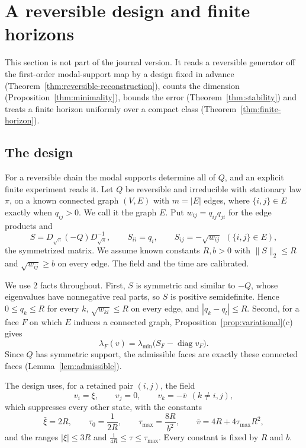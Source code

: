 \section{A reversible design and finite horizons}\label{sec:reversible}

This section is not part of the journal version. It reads a reversible generator off the
first-order modal-support map by a design fixed in advance
(Theorem~\ref{thm:reversible-reconstruction}), counts the dimension
(Proposition~\ref{thm:minimality}), bounds the error (Theorem~\ref{thm:stability}) and treats a
finite horizon uniformly over a compact class (Theorem~\ref{thm:finite-horizon}).

\subsection{The design}\label{sec:reversible-reconstruction}

For a reversible chain the modal supports determine all of $Q$, and an explicit finite
experiment reads it. Let $Q$ be reversible and irreducible with stationary law $\pi$, on a known
connected graph $(V,E)$ with $m=|E|$ edges, where $\{i,j\}\in E$ exactly when $q_{ij}>0$. We
call it the graph $E$.
Put $w_{ij}=q_{ij}q_{ji}$ for the edge products and
\[
 S=D_{\sqrt\pi}(-Q)D_{\sqrt\pi}^{-1},\qquad S_{ii}=q_i,\qquad S_{ij}=-\sqrt{w_{ij}}\ \ (\{i,j\}\in E),
\]
the symmetrized matrix. We assume known constants $R,b>0$ with $\|S\|_2\le R$ and
$\sqrt{w_{ij}}\ge b$ on every edge. The field and the time are calibrated.

We use 2 facts throughout. First, $S$ is symmetric and similar to $-Q$, whose eigenvalues
have nonnegative real parts, so $S$ is positive semidefinite. Hence $0\le q_k\le R$ for every
$k$, $\sqrt{w_{kl}}\le R$ on every edge, and $|q_k-q_l|\le R$. Second, for a face $F$ on which
$E$ induces a connected graph, Proposition~\ref{prop:variational}(c) gives
\begin{equation}\label{eq:lambda-sym}
 \lambda_F(v)=\lambda_{\min}\bigl(S_F-\operatorname{diag}v_F\bigr).
\end{equation}
Since $Q$ has symmetric support, the admissible faces are exactly these connected faces
(Lemma~\ref{lem:admissible}).

The design uses, for a retained pair $(i,j)$, the field
\[
 v_i=\xi,\qquad v_j=0,\qquad v_k=-\bar v\ \ (k\ne i,j),
\]
which suppresses every other state, with the constants
\[
 \bar\xi=2R,\qquad \tau_0=\frac1{2R},\qquad \tau_{\max}=\frac{8R}{b^2},\qquad \bar v=4R+4\tau_{\max}R^2,
\]
and the ranges $|\xi|\le3R$ and $\frac1{4R}\le\tau\le \tau_{\max}$. Every constant is fixed by $R$ and $b$.

